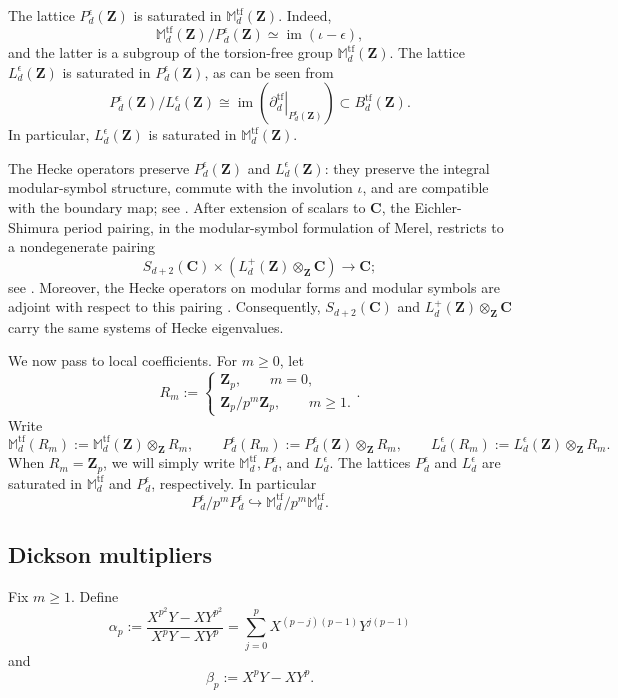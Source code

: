 \documentclass[11pt]{article}
\newcommand{\Z}{\mathbf Z}
\newcommand{\C}{\mathbf C}
\theoremstyle{plain}
\theoremstyle{definition}
\theoremstyle{remark}
\numberwithin{equation}{section}
\begin{document}
The lattice \(P_d^\epsilon(\Z)\) is saturated in \(\mathbb M_d^{\mathrm{tf}}(\Z)\). Indeed, \[\mathbb M_d^{\mathrm{tf}}(\Z)/P_d^\epsilon(\Z)\simeq\operatorname{im}(\iota-\epsilon),\] and the latter is a subgroup of the torsion-free group \(\mathbb M_d^{\mathrm{tf}}(\Z)\). The lattice \(L_d^\epsilon(\Z)\) is saturated in \(P_d^\epsilon(\Z)\), as can be seen from \[ P_d^\epsilon(\Z)/L_d^\epsilon(\Z) \cong \operatorname{im}\!\left( \left. \partial_d^{\mathrm{tf}} \right|_{P_d^\epsilon(\Z)} \right) \subset B_d^{\mathrm{tf}}(\Z). \] In particular, \(L_d^\epsilon(\Z)\) is saturated in \(\mathbb M_d^{\mathrm{tf}}(\Z)\).

The Hecke operators preserve \(P_d^\epsilon(\Z)\) and \(L_d^\epsilon(\Z)\): they preserve the integral modular-symbol structure, commute with the involution \(\iota\), and are compatible with the boundary map; see \cite[\S2.1, Proposition~11 and the following Remark, p.~18]{Merel1994}. After extension of scalars to \(\C\), the Eichler-Shimura period pairing, in the modular-symbol formulation of Merel, restricts to a nondegenerate pairing \[ S_{d+2}(\C) \times \left(L_d^+(\Z)\otimes_{\Z}\C\right) \longrightarrow \C; \] see \cite[\S1.5, Theorem~3, pp.~10--11, and \S1.6, Proposition~8, p.~12]{Merel1994}. Moreover, the Hecke operators on modular forms and modular symbols are adjoint with respect to this pairing \cite[\S2.1, Proposition~10, pp.~17--18]{Merel1994}. Consequently, \(S_{d+2}(\C)\) and \(L_d^+(\Z)\otimes_{\Z}\C\) carry the same systems of Hecke eigenvalues. 

We now pass to local coefficients. For \(m \geq 0\), let \[R_m := \begin{cases} \Z_p, \qquad m = 0, \\ \Z_p / p^m \Z_p, \qquad m \geq 1.\end{cases}.\] Write \[ \mathbb M_d^{\mathrm{tf}}(R_m) := \mathbb M_d^{\mathrm{tf}}(\Z)\otimes_{\Z}R_m, \qquad P_d^\epsilon(R_m) := P_d^\epsilon(\Z)\otimes_{\Z}R_m, \qquad L_d^\epsilon(R_m) := L_d^\epsilon(\Z)\otimes_{\Z}R_m. \] When $R_m = \Z_p$, we will simply write \(\mathbb M_d^{\mathrm{tf}}, P_d^\epsilon\), and \(L_d^\epsilon\). The lattices \(P_d^\epsilon\) and \(L_d^\epsilon\) are saturated in \(\mathbb M_d^{\mathrm{tf}}\) and \(P_d^\epsilon\), respectively. In particular \[P_d^\epsilon/p^mP_d^\epsilon\hookrightarrow\mathbb M_d^{\mathrm{tf}}/p^m\mathbb M_d^{\mathrm{tf}}.\] 



\subsection{Dickson multipliers} Fix \(m\geq1\). Define \[ \alpha_p := \frac{X^{p^2}Y-XY^{p^2}}{X^pY-XY^p} = \sum_{j=0}^p X^{(p-j)(p-1)}Y^{j(p-1)} \] and \[ \beta_p:=X^pY-XY^p. \] 
\end{document}
